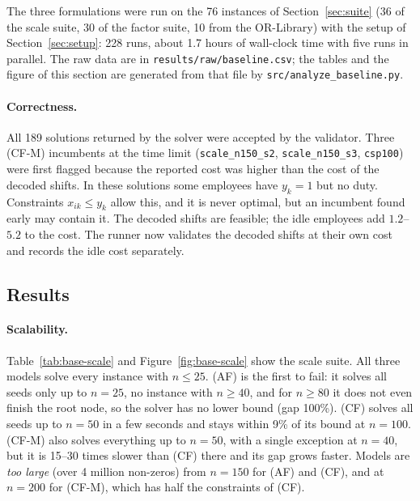 
The three formulations were run on the 76 instances of Section~\ref{sec:suite}
(36 of the scale suite, 30 of the factor suite, 10 from the OR-Library) with
the setup of Section~\ref{sec:setup}: 228 runs, about 1.7 hours of wall-clock
time with five runs in parallel. The raw data are in
\texttt{results/raw/baseline.csv}; the tables and the figure of this section
are generated from that file by \texttt{src/analyze\_baseline.py}.

\paragraph{Correctness.} All 189 solutions returned by the solver were
accepted by the validator. Three (CF-M) incumbents at the time limit
(\texttt{scale\_n150\_s2}, \texttt{scale\_n150\_s3}, \texttt{csp100}) were
first flagged because the reported cost was higher than the cost of the
decoded shifts. In these solutions some employees have $y_k=1$ but no duty.
Constraints $x_{ik}\le y_k$ allow this, and it is never optimal, but an
incumbent found early may contain it. The decoded shifts are feasible; the
idle employees add $1.2$--$5.2$ to the cost. The runner now validates the
decoded shifts at their own cost and records the idle cost separately.

\subsection{Results}

\paragraph{Scalability.} Table~\ref{tab:base-scale} and
Figure~\ref{fig:base-scale} show the scale suite. All three models solve
every instance with $n\le 25$. (AF) is the first to fail: it solves all seeds
only up to $n=25$, no instance with $n\ge 40$, and for $n\ge 80$ it does not
even finish the root node, so the solver has no lower bound (gap 100\%). (CF)
solves all seeds up to $n=50$ in a few seconds and stays within 9\% of its
bound at $n=100$. (CF-M) also solves everything up to $n=50$, with a
single exception at $n=40$, but it is 15--30 times slower than (CF) there and
its gap grows faster. Models are \emph{too large} (over 4 million non-zeros)
from $n=150$ for (AF) and (CF), and at $n=200$ for (CF-M), which has half the
constraints of (CF).

